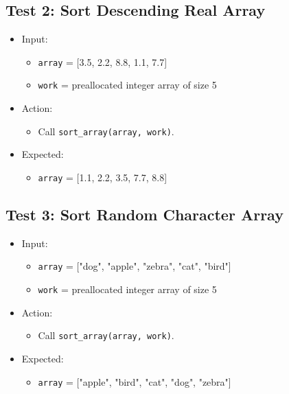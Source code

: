 \documentclass{article}
\begin{document}
\subsection{Test 2: Sort Descending Real Array}

\begin{itemize}
    \item Input:
    \begin{itemize}
        \item \texttt{array} = [3.5, 2.2, 8.8, 1.1, 7.7]
        \item \texttt{work} = preallocated integer array of size 5
    \end{itemize}
    \item Action:
    \begin{itemize}
        \item Call \texttt{sort\_array(array, work)}.
    \end{itemize}
    \item Expected:
    \begin{itemize}
        \item \texttt{array} = [1.1, 2.2, 3.5, 7.7, 8.8]
    \end{itemize}
\end{itemize}

\subsection{Test 3: Sort Random Character Array}

\begin{itemize}
    \item Input:
    \begin{itemize}
        \item \texttt{array} = ["dog", "apple", "zebra", "cat", "bird"]
        \item \texttt{work} = preallocated integer array of size 5
    \end{itemize}
    \item Action:
    \begin{itemize}
        \item Call \texttt{sort\_array(array, work)}.
    \end{itemize}
    \item Expected:
    \begin{itemize}
        \item \texttt{array} = ["apple", "bird", "cat", "dog", "zebra"]
    \end{itemize}
\end{itemize}
\end{document}
